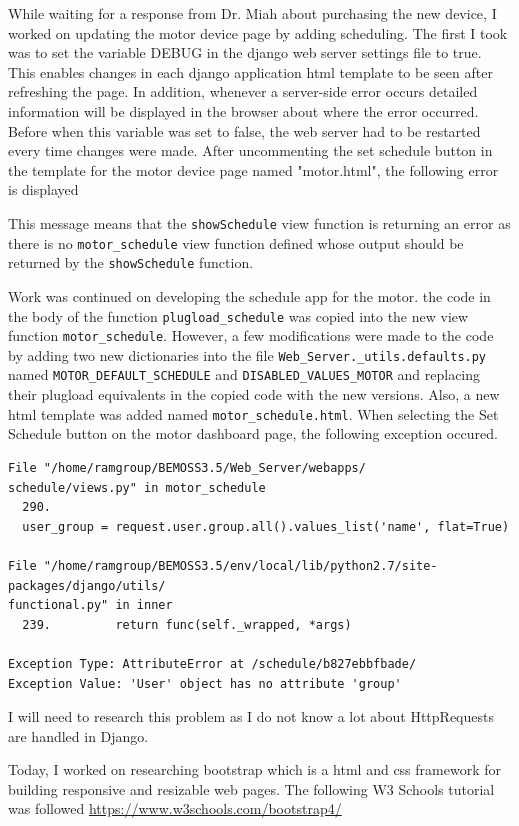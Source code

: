 \documentclass[fontsize=11pt, %
                             paper=letter, %
                             twoside, %
                             captions=tableheading,
                             index=totoc,
                             hyperref]{labbook}
\begin{document}
\begin{addmargin}[0cm]{0cm}
While waiting for a response from Dr. Miah about purchasing the new device, I worked on updating the motor device page by adding scheduling. The first I took was to set the variable DEBUG in the django web server settings file to true. This enables changes in each django application html template to be seen after refreshing the page. In addition, whenever a server-side error occurs detailed information will be displayed in the browser about where the error occurred. Before when this variable was set to false, the web server had to be restarted every time changes were made. 
\smallbreak\noindent
After uncommenting the set schedule button in the template for the motor device page named "motor.html", the following error is displayed

This message means that the \texttt{showSchedule} view function is returning an error as there is no \texttt{motor\_schedule} view function defined whose output should be returned by the \texttt{showSchedule} function.

Work was continued on developing the schedule app for the motor. the code in the body of the function \texttt{plugload\_schedule} was copied into the new view function \texttt{motor\_schedule}. However, a few modifications were made to the code by adding two new dictionaries into the file \texttt{Web\_Server.\_utils.defaults.py} named \texttt{MOTOR\_DEFAULT\_SCHEDULE} and \texttt{DISABLED\_VALUES\_MOTOR} and replacing their plugload equivalents in the copied code with the new versions. Also, a new html template was added named \texttt{motor\_schedule.html}. When selecting the Set Schedule button on the motor dashboard page, the following exception occured.
\begin{Verbatim}
File "/home/ramgroup/BEMOSS3.5/Web_Server/webapps/
schedule/views.py" in motor_schedule
  290.     
  user_group = request.user.group.all().values_list('name', flat=True)

File "/home/ramgroup/BEMOSS3.5/env/local/lib/python2.7/site-packages/django/utils/
functional.py" in inner
  239.         return func(self._wrapped, *args)

Exception Type: AttributeError at /schedule/b827ebbfbade/
Exception Value: 'User' object has no attribute 'group'
\end{Verbatim} 
I will need to research this problem as I do not know a lot about HttpRequests are handled in Django.

Today, I worked on researching bootstrap which is a html and css framework for building responsive and resizable web pages. The following W3 Schools tutorial was followed 
\smallbreak\noindent
\url{https://www.w3schools.com/bootstrap4/}


\end{addmargin}
\end{document}
